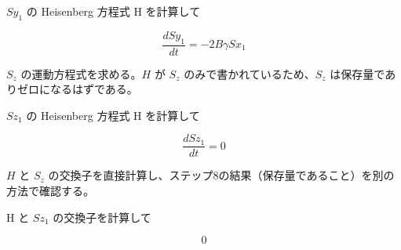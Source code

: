 \documentclass[dvipdfmx,a4paper,11pt]{jsarticle}
\begin{document}
$Sy_1$ の Heisenberg 方程式 H を計算して

\begin{equation}
  \frac{d Sy_1}{d t} = - 2 B \gamma Sx_1
  \label{eq:E5}
\end{equation}

$S_z$ の運動方程式を求める。$H$ が $S_z$ のみで書かれているため、$S_z$ は保存量でありゼロになるはずである。

$Sz_1$ の Heisenberg 方程式 H を計算して

\begin{equation}
  \frac{d Sz_1}{d t} = 0
  \label{eq:E6}
\end{equation}

$H$ と $S_z$ の交換子を直接計算し、ステップ8の結果（保存量であること）を別の方法で確認する。

H と $Sz_1$ の交換子を計算して

\begin{equation}
  0
  \label{eq:E7}
\end{equation}
\end{document}
